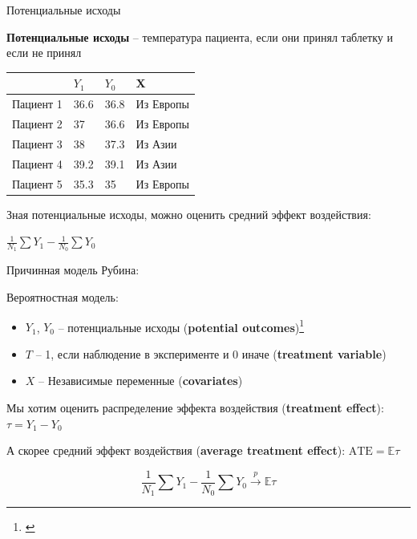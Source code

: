 \begin{frame}{Потенциальные исходы}

\textbf{Потенциальные исходы} -- температура пациента, если они принял таблетку и если не принял

\begin{table}[]
\begin{tabular}{l|l|l||l}
&$Y_1$ & $Y_0$ & X \\
\hline
Пациент 1 & 36.6 & 36.8 & Из Европы  \\
Пациент 2 & 37   & 36.6 &  Из Европы \\
Пациент 3 &38   & 37.3 & Из Азии  \\
Пациент 4 &39.2 & 39.1 & Из Азии  \\
Пациент 5 &35.3 & 35   & Из Европы 
\end{tabular}
\end{table}

Зная потенциальные исходы, можно оценить средний эффект воздействия:

$\frac{1}{N_1}\sum Y_1 - \frac{1}{N_0}\sum Y_0$

\end{frame}

\begin{frame}{Причинная модель Рубина: \cite{rubin1978bayesian}}

Вероятностная модель:

\begin{itemize}
    \item $Y_1$, $Y_0$ -- потенциальные исходы (\textbf{potential outcomes})\footnote{\cite[Раздел 1]{imbens2015causal}}
    \item $T$ -- 1, если наблюдение в эксперименте и 0 иначе (\textbf{treatment variable})
    \item $X$ -- Независимые переменные (\textbf{covariates})
\end{itemize}

Мы хотим оценить распределение эффекта воздействия (\textbf{treatment effect}): $\tau = Y_1 - Y_0$

А скорее средний эффект воздействия (\textbf{average treatment effect}): $\text{ATE} = \mathbb{E}\tau$

$$\frac{1}{N_1}\sum Y_1 - \frac{1}{N_0}\sum Y_0 \overset{p}{\longrightarrow} \mathbb{E}\tau$$


\end{frame}


